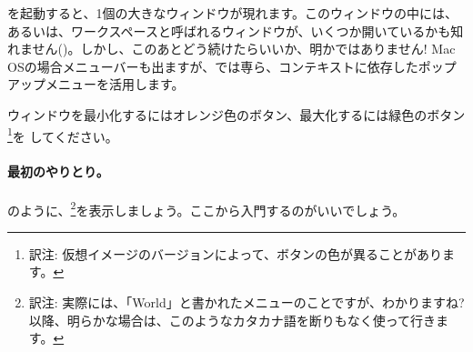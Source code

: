 \documentclass[a4paper,10pt,twoside]{book}
\begin{document}
\pharo を起動すると、1個の大きなウィンドウが現れます。このウィンドウの中には、あるいは、ワークスペースと呼ばれるウィンドウが、いくつか開いているかも知れません()。しかし、このあとどう続けたらいいか、明かではありません!
Mac OSの場合メニューバーも出ますが、\pharo では専ら、コンテキストに依存したポップアップメニューを活用します。


ウィンドウを最小化するにはオレンジ色のボタン、最大化するには緑色のボタン\footnote{訳注: 仮想イメージのバージョンによって、ボタンの色が異ることがあります。}を \click してください。

\paragraph{最初のやりとり。}

のように、\footnote{訳注: 実際には、「World」と書かれたメニューのことですが、わかりますね? 以降、明らかな場合は、このようなカタカナ語を断りもなく使って行きます。}を表示しましょう。ここから入門するのがいいでしょう。


\end{document}
